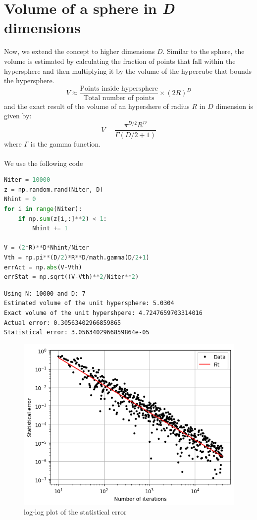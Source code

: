\documentclass{article}
\begin{document}
\section{Volume of a sphere in \textit{D} dimensions}
Now, we extend the concept to higher dimensions $D$. Similar to the sphere, the volume is estimated by calculating the fraction of points that fall within the hypersphere and then multiplying it by the volume of the hypercube that bounds the hypersphere.
\begin{equation}
    V\approx\frac{\text{Points inside hypersphere}}{\text{Total number of points}}\times(2R)^D
\end{equation}
and the exact result of the volume of an hypershere of radius $R$ in $D$ dimension is given by:
\begin{equation}\label{eq:volumehypersphere}
    V=\frac{\pi^{D/2}R^D}{\Gamma(D/2+1)}
\end{equation}
where $\Gamma$ is the gamma function.\\\\
We use the following code
\begin{lstlisting}[language=Python]
Niter = 10000
z = np.random.rand(Niter, D)
Nhint = 0
for i in range(Niter):
    if np.sum(z[i,:]**2) < 1:
        Nhint += 1
        
V = (2*R)**D*Nhint/Niter
Vth = np.pi**(D/2)*R**D/math.gamma(D/2+1)
errAct = np.abs(V-Vth)
errStat = np.sqrt((V-Vth)**2/Niter**2)
\end{lstlisting}
\begin{lstlisting}
Using N: 10000 and D: 7
Estimated volume of the unit hypersphere: 5.0304
Exact volume of the unit hypershpere: 4.7247659703314016
Actual error: 0.30563402966859865
Statistical error: 3.0563402966859864e-05
\end{lstlisting}
\begin{figure}[H]
    \centering
    \includegraphics[width=.7\linewidth]{images/Figure3.2.png}
    \caption{log-log plot of the statistical error}
    \label{fig:3.2}
\end{figure}
\end{document}
